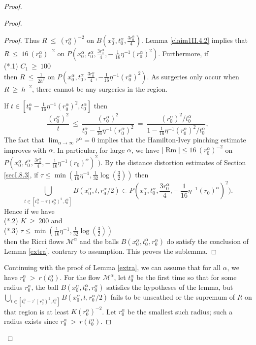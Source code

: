 \documentclass[12pt]{amsart}
\newcommand{\al}{\alpha}
\newcommand{\M}{{\mathcal M}}
\newcommand{\Rm}{\operatorname{Rm}}
\numberwithin{equation}{section}
\theoremstyle{plain}
\theoremstyle{definition}
\theoremstyle{remark}
\begin{document}
\begin{proof}
\begin{proof}
\begin{proof}
Thus $R \: \le \: (r_0^\al)^{-2}$ on 
$B(x_0^\al, t_0^\al, \frac{3r_0^\al}{4})$. 
Lemma \ref{claim1II.4.2} 
implies that 
$R \: \le \: 16 \: (r_0^\al)^{-2}$ on
$P(x^\al_0, t^\al_0,  \frac{3r_0^\al}{4}, 
- \: \frac{1}{16} \eta^{-1} (r_0^\al)^2)$.
Furthermore, if \\
(*.1) $C_1 \: \ge \: 100$ \\
then $R \: \le \: \frac{1}{2 h^2}$ on $P(x_0^\al, t_0^\al, \frac{3r_0^\al}{4},
- \frac{1}{16} \eta^{-1} (r_0^\al)^2)$.
As surgeries only occur when $R \: \ge \: h^{-2}$,
there cannot be any surgeries in the region.

If $t \in [t_0^\al - \frac{1}{16} \eta^{-1} (r_0^\al)^2, t_0^\al]$ then
\begin{equation}
\frac{(r_0^\al)^2}{t} \: \le \: 
\frac{(r_0^\al)^2}{t_0^\al - \frac{1}{16} \eta^{-1} (r_0^\al)^2} \: = \: 
\frac{(r_0^\al)^2/t_0^\al}{1 - \frac{1}{16} \eta^{-1} (r_0^\al)^2/t_0^\al},
\end{equation}
The fact that $\lim_{\alpha \rightarrow \infty} \overline{r}^\al = 0$
implies that the Hamilton-Ivey pinching estimate improves with $\al$.
In particular, for large $\al$, we have $|\Rm| \le 
16 \: (r_0^\al)^{-2}$ on
$P(x^\al_0, t^\al_0,  \frac{3r_0^\al}{4}, 
- \: \frac{1}{16} \eta^{-1} (r_0)^\al)^2)$.
By the distance distortion estimates of Section \ref{secI.8.3},
if $\tau \le \min \left( \frac{1}{16} \eta^{-1}, 
\frac{1}{32} \log(\frac32) \right)$ then
\begin{equation}
\bigcup_{t \in [t_0^\al -\tau (r^\al_0)^2, t^\al_0]} 
B(x^\al_0, t, r^\al_0/2) \subset P(x^\al_0, t^\al_0,  \frac{3r_0^\al}{4}, 
- \: \frac{1}{16} \eta^{-1} (r_0)^\al)^2).
\end{equation}
Hence if we have \\
(*.2) $K \: \ge \: 200$ and \\
(*.3) $\tau \le \min \left( \frac{1}{16} \eta^{-1}, 
\frac{1}{32} \log(\frac32) \right)$\\
then the Ricci flows $\M^\al$ and the balls
$B(x_0^\al, t_0^\al, r_0^\al)$ do satisfy the conclusion of
Lemma \ref{extra}, contrary to assumption. This proves the
sublemma.
\end{proof}

Continuing with the proof of Lemma \ref{extra}, we can assume that
for all $\al$, we have $r_0^\al \: > \: r(t_0^\al)$.
For the flow $\M^\alpha$,
let $t_0^\alpha$ be the first time so that for some radius $r_0^\al$,
the ball $B(x_0^\al, t_0^\al, r_0^\al)$ satisfies the hypotheses of the
lemma, but
$\bigcup_{t \in [t_0^\al -\tau^\prime (r^\al_0)^2, t^\al_0]} 
B(x^\al_0, t, r^\al_0/2)$ fails to be unscathed or the
supremum of $R$ on that region is at least
$K (r_0^\al)^{-2}$.
Let $r_0^\al$ be the smallest such radius;
such a radius exists since
$r_0^\alpha \: > \: r(t_0^\alpha)$.


\end{proof}
\end{proof}
\end{document}
